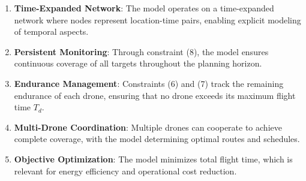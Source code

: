 \documentclass[preprint,review,12pt,3p,authoryear]{elsarticle}
\begin{document}
\begin{enumerate}
    \item \textbf{Time-Expanded Network}: The model operates on a time-expanded network where nodes represent location-time pairs, enabling explicit modeling of temporal aspects.
    
    \item \textbf{Persistent Monitoring}: Through constraint (8), the model ensures continuous coverage of all targets throughout the planning horizon.
    
    \item \textbf{Endurance Management}: Constraints (6) and (7) track the remaining endurance of each drone, ensuring that no drone exceeds its maximum flight time $T_d$.
    
    \item \textbf{Multi-Drone Coordination}: Multiple drones can cooperate to achieve complete coverage, with the model determining optimal routes and schedules.
    
    \item \textbf{Objective Optimization}: The model minimizes total flight time, which is relevant for energy efficiency and operational cost reduction.
\end{enumerate}

% 
% 
\end{document}
